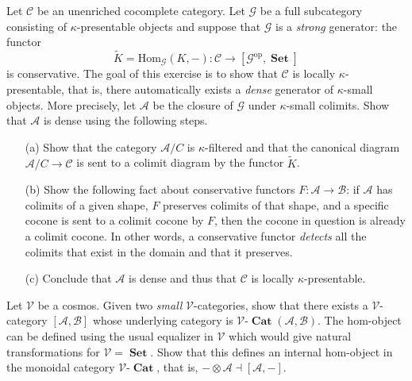 \documentclass[12pt, a4paper]{article}
\DeclareMathOperator{\op}{op}
\DeclareMathOperator{\Cat}{\mathbf{Cat}}
\DeclareMathOperator{\Set}{\mathbf{Set}}
\newcommand{\ca}[1]{\mathscr{#1}}
\newcommand{\Vcat}{\ca{V}\mbox{-}\Cat}
\theoremstyle{plain}
\theoremstyle{definition}
\theoremstyle{citing}
\theoremstyle{citingdfn}
\numberwithin{equation}{section}
\begin{document}
\begin{question}
 Let $\ca{C}$ be an unenriched cocomplete category. Let $\ca{G}$ be a full subcategory consisting of $\kappa$-presentable objects and suppose that $\ca{G}$ is a \emph{strong} generator: the functor 
 \[
 \widetilde{K}=\mathrm{Hom}_{\ca{G}}(K,-) \colon \ca{C} \rightarrow [\ca{G}^{\op},\Set]
 \]
 is conservative. The goal of this exercise is to show that $\ca{C}$ is locally $\kappa$-presentable, that is, there automatically exists a \emph{dense} generator of $\kappa$-small  objects. More precisely, let $\ca{A}$ be the closure of $\ca{G}$ under $\kappa$-small colimits. Show that $\ca{A}$ is dense using the following steps.
 
 \begin{enumerate}
 \item[(a)] Show that the category $\ca{A} \slash C$ is $\kappa$-filtered and that the canonical diagram $\ca{A} \slash C \rightarrow \ca{C}$ is sent to a colimit diagram by the functor $\widetilde{K}$.
 \item[(b)] Show the following fact about conservative functors $F \colon \ca{A} \rightarrow \ca{B}$: if $\ca{A}$ has colimits of a given shape, $F$ preserves colimits of that shape, and a specific cocone is sent to a colimit cocone by $F$, then the cocone in question is already a colimit cocone. In other words, a conservative functor \emph{detects} all the colimits that exist in the domain and that it preserves.
 \item[(c)] Conclude that $\ca{A}$ is dense and thus that $\ca{C}$ is locally $\kappa$-presentable.
 \end{enumerate}
 \end{question}

\begin{question}[subtitle=(bonus)]
 Let $\ca{V}$ be a cosmos. Given two \emph{small} $\ca{V}$-categories, show that there exists a $\ca{V}$-category $[\ca{A},\ca{B}]$ whose underlying category is $\Vcat(\ca{A},\ca{B})$. The hom-object can be defined using the usual equalizer in $\ca{V}$ which would give natural transformations for $\ca{V}=\Set$. Show that this  defines an internal hom-object in the monoidal category $\Vcat$, that is, $- \otimes \ca{A} \dashv [\ca{A},-]$.
\end{question}
\end{document}
